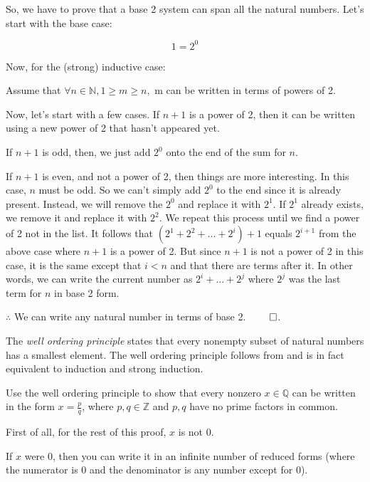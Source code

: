 \documentclass[answers]{exam}
\theoremstyle{remark}
\theoremstyle{definition}
\newcommand{\NN}{\mathbb{N}}
\newcommand{\QQ}{\mathbb{Q}}
\newcommand{\ZZ}{\mathbb{Z}}
\begin{document}
\begin{questions}
\begin{solution}

So, we have to prove that a base 2 system can span all the natural numbers.
Let's start with the base case:

\[1 = 2^0\]

Now, for the (strong) inductive case:

Assume that $\forall n \in \NN, 1 \geq m \geq n,$ m can be written in terms of powers of 2.

Now, let's start with a few cases.
If $n + 1$ is a power of 2, then it can be written using a new
power of 2 that hasn't appeared yet.

If $n + 1$ is odd, then, we just add $2^0$ onto the end of the sum for $n$.

If $n + 1$ is even, and not a power of 2, then things are more interesting.
In this case, $n$ must be odd. So we can't simply add $2^0$ to the end since
it is already present. Instead, we will remove the $2^0$ and replace it with $2^1$.
If $2^1$ already exists, we remove it and replace it with $2^2$. We repeat this process
until we find a power of 2 not in the list. It follows that
$(2^1 + 2^2 + ... + 2^i) + 1$ equals $2^{i+1}$ from the above case where
$n+1$ is a power of 2. But since $n+1$
is not a power of 2 in this case,
it is the same except that $i < n$ and that there are terms after it.
In other words, we can write the current number as
$2^i + ... + 2^j$ where $2^j$ was the last term for $n$ in base 2 form.

$\therefore$ We can write any natural number in terms of base 2. $\qed$.

\end{solution}

\question The \emph{well ordering principle} states that every nonempty subset of natural numbers has a smallest element. The well ordering principle follows from and is in fact equivalent to induction and strong induction.

Use the well ordering principle to show that every nonzero $x \in \QQ$ can be written in the form $x = \frac{p}{q}$, where $p,q \in \ZZ$ and $p,q$ have no prime factors in common.

\begin{solution}

First of all, for the rest of this proof, $x$ is not $0$.

If $x$ were $0$, then you can write it in an infinite number of reduced forms
(where the numerator is $0$ and the denominator is any number except for $0$).


\end{solution}
\end{questions}
\end{document}

